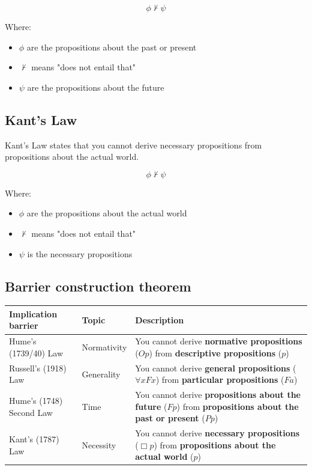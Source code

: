 \documentclass[11pt]{article}
\begin{document}
\[\phi \nvdash \psi\]

Where:
\begin{itemize}
\item \(\phi\) are the propositions about the past or present
\item \(\nvdash\) means "does not entail that"
\item \(\psi\) are the propositions about the future
\end{itemize}

 \newpage
\subsection{Kant's Law}
\label{sec:org430de77}
Kant's Law states that you cannot derive necessary propositions from propositions about the actual world.

\[\phi \nvdash \psi\]

Where:
\begin{itemize}
\item \(\phi\) are the propositions about the actual world
\item \(\nvdash\) means "does not entail that"
\item \(\psi\) is the necessary propositions
\end{itemize}
\subsection{Barrier construction theorem}
\label{sec:org0e71493}
\begin{center}
\begin{tabularx}{\textwidth}{|X|X|X|}
\hline
Implication barrier & Topic & Description\\
\hline
Hume's (1739/40) Law & Normativity & You cannot derive \textbf{normative propositions} (\(Op\)) from \textbf{descriptive propositions} (\(p\))\\
\hline
Russell's (1918) Law & Generality & You cannot derive \textbf{general propositions} (\(\forall x F x\)) from \textbf{particular propositions} (\(Fa\))\\
\hline
Hume's (1748) Second Law & Time & You cannot derive \textbf{propositions about the future} (\(Fp\)) from \textbf{propositions about the past or present} (\(Pp\))\\
\hline
Kant's (1787) Law & Necessity & You cannot derive \textbf{necessary propositions} (\(\Box p\)) from \textbf{propositions about the actual world} (\(p\))\\
\hline
\end{tabularx}
\end{center}
\end{document}
